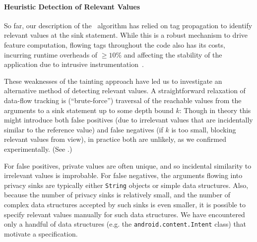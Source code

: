 \paragraph{Heuristic Detection of Relevant Values} So far, our description of the \Tool\ algorithm has relied on tag propagation to identify relevant values at the sink statement. While this is a robust mechanism to drive feature computation, flowing tags throughout the code also has its costs, incurring runtime overheads of $\geq 10\%$ and affecting the stability of the application due to intrusive instrumentation~\cite{EGCCJMS:OSDI10}.

These weaknesses of the tainting approach have led us to investigate an alternative method of detecting relevant values. A straightforward relaxation of data-flow tracking is  (``brute-force'') traversal of the reachable values from the arguments to a sink statement up to some depth bound $k$: 
Though in theory this might introduce both false positives (due to irrelevant values that are incidentally similar to the reference value) and false negatives (if $k$ is too small, blocking relevant values from view), in practice both are unlikely, as we confirmed experimentally. (See .) 

For false positives, private values are often unique, and so incidental similarity to irrelevant values is improbable. For false negatives, the arguments flowing into privacy sinks are typically either {\tt String} objects or simple data structures. Also, because the number of privacy sinks is relatively small, and the number of complex data structures accepted by such sinks is even smaller, it is possible to specify relevant values manually for such data structures. We have encountered only a handful of data structures (e.g. the \texttt{android.content.Intent} class) that motivate a specification. 



